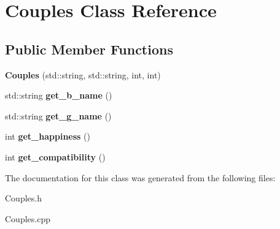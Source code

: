 \hypertarget{classCouples}{}\section{Couples Class Reference}
\label{classCouples}
\subsection*{Public Member Functions}
\begin{DoxyCompactItemize}
\item 
{\bfseries Couples} (std\+::string, std\+::string, int, int)\hypertarget{classCouples_a9fc8017d1f7f165e0b3d47f9102efe1a}{}\label{classCouples_a9fc8017d1f7f165e0b3d47f9102efe1a}

\item 
std\+::string {\bfseries get\+\_\+b\+\_\+name} ()\hypertarget{classCouples_af5fec201f288794a3506cf8b2150c12a}{}\label{classCouples_af5fec201f288794a3506cf8b2150c12a}

\item 
std\+::string {\bfseries get\+\_\+g\+\_\+name} ()\hypertarget{classCouples_a3c6efbde3a938c1ef8dfd29aee8bc372}{}\label{classCouples_a3c6efbde3a938c1ef8dfd29aee8bc372}

\item 
int {\bfseries get\+\_\+happiness} ()\hypertarget{classCouples_a0fcbada217674eff13dcd8149f3947dd}{}\label{classCouples_a0fcbada217674eff13dcd8149f3947dd}

\item 
int {\bfseries get\+\_\+compatibility} ()\hypertarget{classCouples_a88d16f800fd02c6028ae95ccf84e0b23}{}\label{classCouples_a88d16f800fd02c6028ae95ccf84e0b23}

\end{DoxyCompactItemize}


The documentation for this class was generated from the following files\+:\begin{DoxyCompactItemize}
\item 
Couples.\+h\item 
Couples.\+cpp\end{DoxyCompactItemize}
